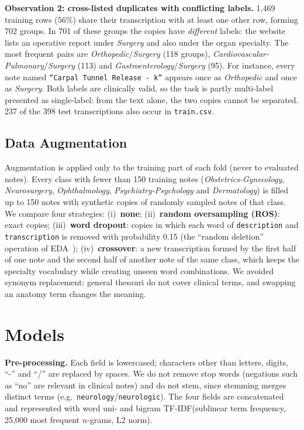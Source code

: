 \documentclass[twocolumn,10pt]{article}
\newcommand{\tfidf}{TF-IDF\xspace}
\newcommand{\ros}{ROS\xspace}
\newcommand{\spec}[1]{\textit{#1}}
\begin{document}
\textbf{Observation 2: cross-listed duplicates with conflicting labels.} 1,469 training rows (56\%) share their transcription with at least one other row, forming 702 groups. In 701 of these groups the copies have \emph{different} labels: the website lists an operative report under \spec{Surgery} and also under the organ specialty. The most frequent pairs are \spec{Orthopedic}/\spec{Surgery} (118 groups), \spec{Cardiovascular-Pulmonary}/\spec{Surgery} (113) and \spec{Gastroenterology}/\spec{Surgery} (95). For instance, every note named \texttt{``Carpal Tunnel Release - $k$''} appears once as \spec{Orthopedic} and once as \spec{Surgery}. Both labels are clinically valid, so the task is partly multi-label presented as single-label: from the text alone, the two copies cannot be separated. 237 of the 398 test transcriptions also occur in \texttt{train.csv}.

\subsection{Data Augmentation}

Augmentation is applied only to the training part of each fold (never to evaluated notes). Every class with fewer than 150 training notes (\spec{Obstetrics-Gynecology}, \spec{Neurosurgery}, \spec{Ophthalmology}, \spec{Psychiatry-Psychology} and \spec{Dermatology}) is filled up to 150 notes with synthetic copies of randomly sampled notes of that class. We compare four strategies:
(i)~\textbf{none};
(ii)~\textbf{random oversampling (\ros)}: exact copies;
(iii)~\textbf{word dropout}: copies in which each word of \texttt{description} and \texttt{transcription} is removed with probability 0.15 (the ``random deletion'' operation of EDA~\cite{wei2019eda});
(iv)~\textbf{crossover}: a new transcription formed by the first half of one note and the second half of another note of the same class, which keeps the specialty vocabulary while creating unseen word combinations.
We avoided synonym replacement: general thesauri do not cover clinical terms, and swapping an anatomy term changes the meaning.

\section{Models}

\textbf{Pre-processing.} Each field is lowercased; characters other than letters, digits, ``-'' and ``/'' are replaced by spaces. We do not remove stop words (negations such as ``no'' are relevant in clinical notes) and do not stem, since stemming merges distinct terms (e.g.\ \texttt{neurology}/\texttt{neurologic}). The four fields are concatenated and represented with word uni- and bigram \tfidf (sublinear term frequency, 25,000 most frequent $n$-grams, L2 norm).
\end{document}
